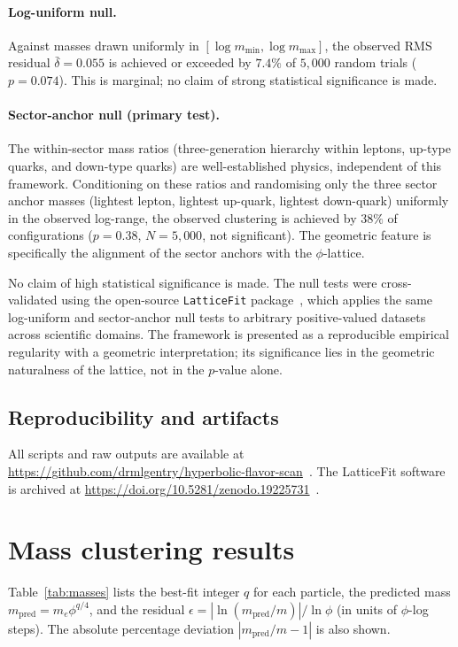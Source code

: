 ﻿\documentclass[12pt]{article}
\theoremstyle{definition}
\begin{document}
\paragraph{Log-uniform null.}
Against masses drawn uniformly in $[\log m_{\min}, \log m_{\max}]$, the observed RMS residual $\bar\delta = 0.055$ is achieved or exceeded by $7.4\%$ of $5{,}000$ random trials ($p = 0.074$). This is marginal; no claim of strong statistical significance is made.

\paragraph{Sector-anchor null (primary test).}
The within-sector mass ratios (three-generation hierarchy within leptons, up-type quarks, and down-type quarks) are well-established physics, independent of this framework. Conditioning on these ratios and randomising only the three sector anchor masses (lightest lepton, lightest up-quark, lightest down-quark) uniformly in the observed log-range, the observed clustering is achieved by $38\%$ of configurations ($p = 0.38$, $N = 5{,}000$, not significant). The geometric feature is specifically the alignment of the sector anchors with the $\phi$-lattice.

No claim of high statistical significance is made. The null tests were cross-validated using the open-source \texttt{LatticeFit} package~\cite{Gentry:LatticeFit}, which applies the same log-uniform and sector-anchor null tests to arbitrary positive-valued datasets across scientific domains. The framework is presented as a reproducible empirical regularity with a geometric interpretation; its significance lies in the geometric naturalness of the lattice, not in the $p$-value alone.

\subsection{Reproducibility and artifacts}
All scripts and raw outputs are available at \url{https://github.com/drmlgentry/hyperbolic-flavor-scan}~\cite{Gentry:Scan}. The LatticeFit software is archived at \url{https://doi.org/10.5281/zenodo.19225731}~\cite{Gentry:LatticeFit}.

\section{Mass clustering results}
\label{sec:mass_results}

Table~\ref{tab:masses} lists the best-fit integer $q$ for each particle, the predicted mass $m_{\text{pred}} = m_e \phi^{q/4}$, and the residual $\epsilon = |\ln(m_{\text{pred}}/m)|/\ln\phi$ (in units of $\phi$-log steps). The absolute percentage deviation $|m_{\text{pred}}/m - 1|$ is also shown.
\end{document}
